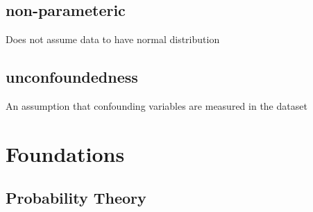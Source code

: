 \documentclass[11pt]{article}
\begin{document}
\subsection{non-parameteric}
\label{sec:org3b16485}
Does not assume data to have normal distribution
\subsection{unconfoundedness}
\label{sec:orgb5b07b2}
An assumption that confounding variables are measured in the dataset  

\section{Foundations}
\label{sec:orgef634ff}
\subsection{Probability Theory}
\label{sec:org1092bf7}
\end{document}
